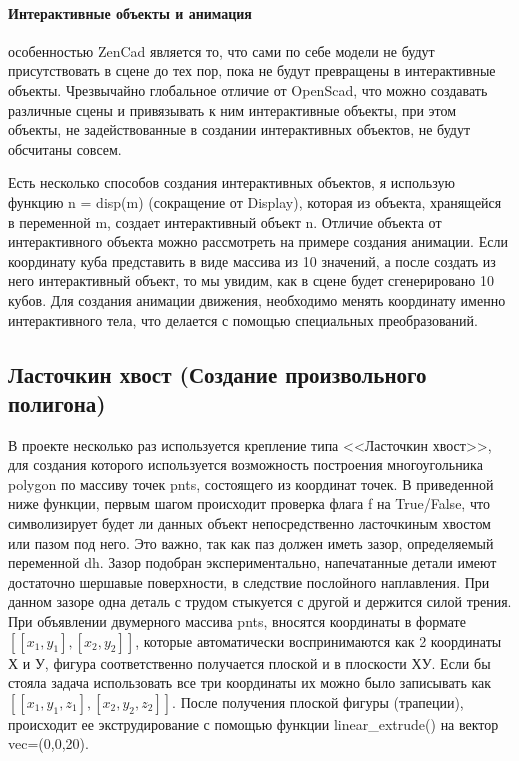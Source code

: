 \paragraph{Интерактивные объекты и анимация} особенностью ZenCad является то, что сами по себе модели не будут присутствовать в сцене до тех пор, пока не будут превращены в интерактивные объекты. Чрезвычайно глобальное отличие от OpenScad, что можно создавать различные сцены и привязывать к ним интерактивные объекты, при этом объекты, не задействованные в создании интерактивных объектов, не будут обсчитаны совсем.

Есть несколько способов создания интерактивных объектов, я использую функцию n = disp(m) (сокращение от Display), которая из объекта, хранящейся в переменной m, создает интерактивный объект n. Отличие объекта от интерактивного объекта можно рассмотреть на примере создания анимации. Если координату куба представить в виде массива из 10 значений, а после создать из него интерактивный объект, то мы увидим, как в сцене будет сгенерировано 10 кубов. Для создания анимации движения, необходимо менять координату именно интерактивного тела, что делается с помощью специальных преобразований. 


\subsection{Ласточкин хвост (Создание произвольного полигона)} 
В проекте несколько раз используется крепление типа <<Ласточкин хвост>>, для создания которого используется возможность построения многоугольника polygon по массиву точек pnts, состоящего из координат точек. В приведенной ниже функции, первым шагом происходит проверка флага f на True/False, что символизирует будет ли данных объект непосредственно ласточкиным хвостом или пазом под него. Это важно, так как паз должен иметь зазор, определяемый переменной dh. Зазор подобран экспериментально, напечатанные детали имеют достаточно шершавые поверхности, в следствие послойного наплавления. При данном зазоре одна деталь с трудом стыкуется с другой и держится силой трения. При объявлении двумерного массива pnts, вносятся координаты в формате $[[x_{1},y_{1}] , [x_{2},y_{2}]]$, которые автоматически воспринимаются как 2 координаты Х и У, фигура соответственно получается плоской и в плоскости ХУ. Если бы стояла задача использовать все три координаты их можно было записывать как $[[x_{1},y_{1},z_{1}] , [x_{2},y_{2},z_{2}]]$. После получения плоской фигуры (трапеции), происходит ее экструдирование с помощью функции linear\_extrude() на вектор vec=(0,0,20).         

